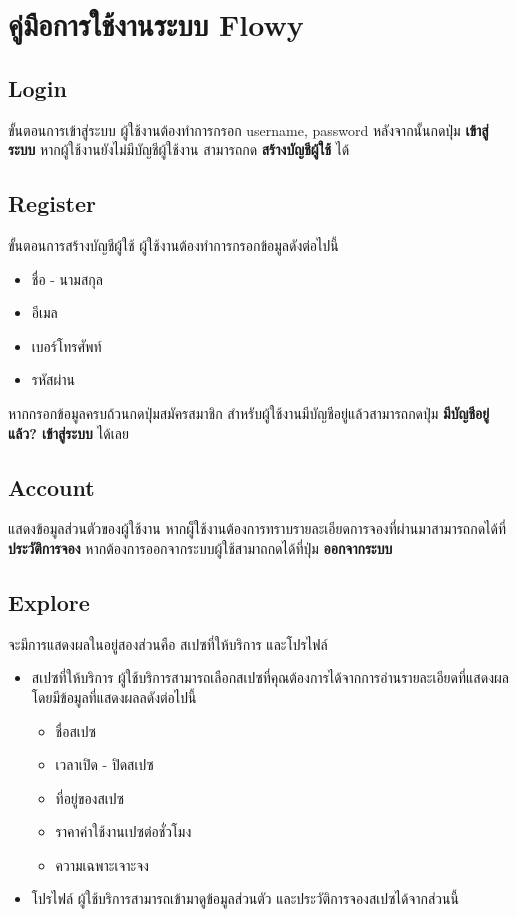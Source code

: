 \chapter{คู่มือการใช้งานระบบ Flowy}

\section{Login}
ขั้นตอนการเข้าสู่ระบบ ผู้ใช้งานต้องทำการกรอก username, password หลังจากนั้นกดปุ่ม \textbf{เข้าสู่ระบบ} หากผู้ใช้งานยังไม่มีบัญชีผู้ใช้งาน สามารถกด \textbf{สร้างบัญชีผู้ใช้} ได้

\section{Register}
ขั้นตอนการสร้างบัญชีผู้ใช้ ผู้ใช้งานต้องทำการกรอกข้อมูลดังต่อไปนี้
\begin{itemize}
    \item ชื่อ - นามสกุล
    \item อีเมล
    \item เบอร์โทรศัพท์
    \item รหัสผ่าน  
\end{itemize}
หากกรอกข้อมูลครบถ้วนกดปุ่มสมัครสมาชิก สำหรับผู้ใช้งานมีบัญชีอยู่แล้วสามารถกดปุ่ม \textbf{มีบัญชีอยู่แล้ว? เข้าสู่ระบบ} ได้เลย

\section{Account}
แสดงข้อมูลส่วนตัวของผู้ใช้งาน หากผู็ใช้งานต้องการทราบรายละเอียดการจองที่ผ่านมาสามารถกดได้ที่ \textbf{ประวัติการจอง} หากต้องการออกจากระบบผู้ใช้สามาถกดได้ที่ปุ่ม \textbf{ออกจากระบบ}

\section{Explore}
จะมีการแสดงผลในอยู่สองส่วนคือ สเปซที่ให้บริการ และโปรไฟล์
\begin{itemize}
    \item สเปซที่ให้บริการ ผู้ใช้บริการสามารถเลือกสเปซที่คุณต้องการได้จากการอ่านรายละเอียดที่แสดงผล โดยมีข้อมูลที่แสดงผลลดังต่อไปนี้
    \begin{itemize}
        \item ชื่อสเปซ
        \item เวลาเปิด - ปิดสเปซ
        \item ที่อยู่ของสเปซ
        \item ราคาค่าใช้งานเปซต่อชั่วโมง
        \item ความเฉพาะเจาะจง        
    \end{itemize}
    \item โปรไฟล์ ผู้ใช้บริการสามารถเข้ามาดูข้อมูลส่วนตัว และประวัติการจองสเปซได้จากส่วนนี้ 
\end{itemize}

